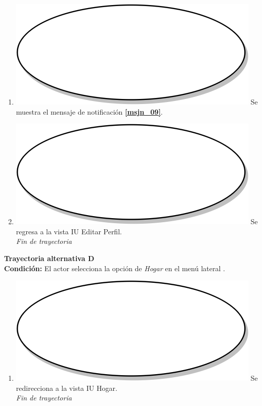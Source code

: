 \begin{enumerate}[label=C\arabic*]
    \item {\includegraphics[scale=.05]{Capitulo3/img/proceso.png} Se muestra el mensaje de notificación \textbf{\ref{msjn_09}}.} \\
    \item {\includegraphics[scale=.05]{Capitulo3/img/proceso.png} Se regresa a la vista IU Editar Perfil.} \\
    \textit{Fin de trayectoria} \\
\end{enumerate}

\textbf{Trayectoria alternativa D} \label{cu3_ta_d} \\
\textbf{Condición:} El actor selecciona la opción de \textit{Hogar} en el menú lateral \textbf{}. \\
 \begin{enumerate}[label=D\arabic*]
    \item {\includegraphics[scale=.05]{Capitulo3/img/proceso.png} Se redirecciona a la vista IU Hogar.} \\
    \textit{Fin de trayectoria} \\
\end{enumerate}

